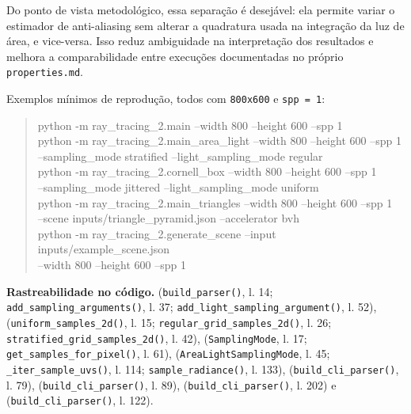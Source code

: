 \documentclass[portuguese]{sbcreviews-2025}%
\begin{document}
Do ponto de vista metodológico, essa separação é desejável: ela permite variar o estimador de anti-aliasing sem alterar a quadratura usada na integração da luz de área, e vice-versa. Isso reduz ambiguidade na interpretação dos resultados e melhora a comparabilidade entre execuções documentadas no próprio \texttt{properties.md}.

Exemplos mínimos de reprodução, todos com \texttt{800x600} e \texttt{spp = 1}:

\begin{quote}
\small\ttfamily
python -m ray\_tracing\_2.main --width 800 --height 600 --spp 1\\
python -m ray\_tracing\_2.main\_area\_light --width 800 --height 600 --spp 1\\
\hspace*{1em}--sampling\_mode stratified --light\_sampling\_mode regular\\
python -m ray\_tracing\_2.cornell\_box --width 800 --height 600 --spp 1\\
\hspace*{1em}--sampling\_mode jittered --light\_sampling\_mode uniform\\
python -m ray\_tracing\_2.main\_triangles --width 800 --height 600 --spp 1\\
\hspace*{1em}--scene inputs/triangle\_pyramid.json --accelerator bvh\\
python -m ray\_tracing\_2.generate\_scene --input inputs/example\_scene.json\\
\hspace*{1em}--width 800 --height 600 --spp 1
\end{quote}

\noindent\textbf{Rastreabilidade no código.}  (\texttt{build\_parser()}, l. 14; \texttt{add\_sampling\_arguments()}, l. 37; \texttt{add\_light\_sampling\_argument()}, l. 52),  (\texttt{uniform\_samples\_2d()}, l. 15; \texttt{regular\_grid\_samples\_2d()}, l. 26; \texttt{stratified\_grid\_samples\_2d()}, l. 42),  (\texttt{SamplingMode}, l. 17; \texttt{get\_samples\_for\_pixel()}, l. 61),  (\texttt{AreaLightSamplingMode}, l. 45; \texttt{\_iter\_sample\_uvs()}, l. 114; \texttt{sample\_radiance()}, l. 133),  (\texttt{build\_cli\_parser()}, l. 79),  (\texttt{build\_cli\_parser()}, l. 89),  (\texttt{build\_cli\_parser()}, l. 202) e  (\texttt{build\_cli\_parser()}, l. 122).
\end{document}
